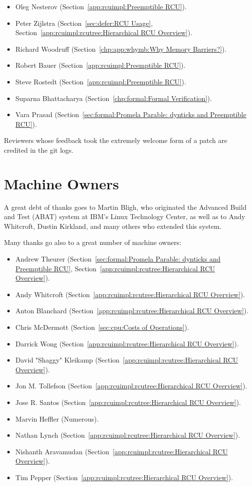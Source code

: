 \begin{itemize}
\item	Oleg Nesterov (Section~\ref{app:rcuimpl:Preemptible RCU}).
\item	Peter Zijlstra
	(Section~\ref{sec:defer:RCU Usage}, %
	Section~\ref{app:rcuimpl:rcutree:Hierarchical RCU Overview}).
\item	Richard Woodruff (Section~\ref{chp:app:whymb:Why Memory Barriers?}).
\item	Robert Bauer (Section~\ref{app:rcuimpl:Preemptible RCU}).
\item	Steve Rostedt (Section~\ref{app:rcuimpl:Preemptible RCU}).
\item	Suparna Bhattacharya
	(Section~\ref{chp:formal:Formal Verification}).
\item	Vara Prasad
	(Section~\ref{sec:formal:Promela Parable: dynticks and Preemptible RCU}).
\end{itemize}

Reviewers whose feedback took the extremely welcome form of a patch
are credited in the git logs.

\section{Machine Owners}

A great debt of thanks goes to Martin Bligh, who originated the
Advanced Build and Test (ABAT) system at IBM's Linux Technology
Center, as well as to Andy Whitcroft, Dustin Kirkland, and many
others who extended this system.

Many thanks go also to a great number of machine owners:

\begin{itemize}
\item	Andrew Theurer
	(Section~\ref{sec:formal:Promela Parable: dynticks and Preemptible RCU},
	Section~\ref{app:rcuimpl:rcutree:Hierarchical RCU Overview}).
\item	Andy Whitcroft (Section~\ref{app:rcuimpl:rcutree:Hierarchical RCU Overview}).
\item	Anton Blanchard (Section~\ref{app:rcuimpl:rcutree:Hierarchical RCU Overview}).
\item	Chris McDermott (Section~\ref{sec:cpu:Costs of Operations}).
\item	Darrick Wong (Section~\ref{app:rcuimpl:rcutree:Hierarchical RCU Overview}).
\item	David "Shaggy" Kleikamp (Section~\ref{app:rcuimpl:rcutree:Hierarchical RCU Overview}).
\item	Jon M. Tollefson (Section~\ref{app:rcuimpl:rcutree:Hierarchical RCU Overview}).
\item	Jose R. Santos (Section~\ref{app:rcuimpl:rcutree:Hierarchical RCU Overview}).
\item	Marvin Heffler (Numerous).
\item	Nathan Lynch (Section~\ref{app:rcuimpl:rcutree:Hierarchical RCU Overview}).
\item	Nishanth Aravamudan (Section~\ref{app:rcuimpl:rcutree:Hierarchical RCU Overview}).
\item	Tim Pepper (Section~\ref{app:rcuimpl:rcutree:Hierarchical RCU Overview}).
\end{itemize}

